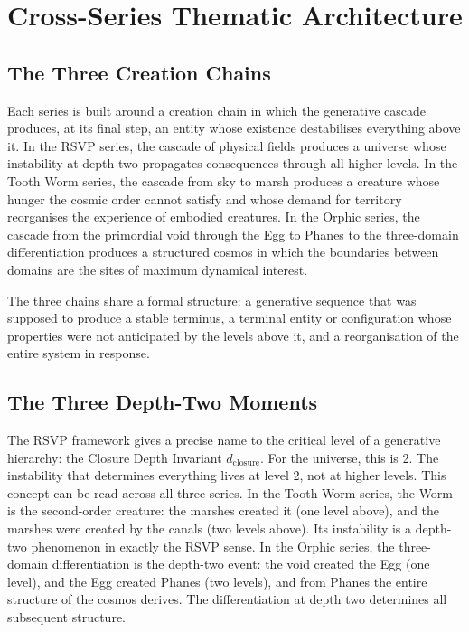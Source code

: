 \documentclass[12pt, a4paper]{article}
\begin{document}
\newpage
\section{Cross-Series Thematic Architecture}

\subsection{The Three Creation Chains}

Each series is built around a creation chain in which the generative cascade produces, at its final step, an entity whose existence destabilises everything above it. In the RSVP series, the cascade of physical fields produces a universe whose instability at depth two propagates consequences through all higher levels. In the Tooth Worm series, the cascade from sky to marsh produces a creature whose hunger the cosmic order cannot satisfy and whose demand for territory reorganises the experience of embodied creatures. In the Orphic series, the cascade from the primordial void through the Egg to Phanes to the three-domain differentiation produces a structured cosmos in which the boundaries between domains are the sites of maximum dynamical interest.

The three chains share a formal structure: a generative sequence that was supposed to produce a stable terminus, a terminal entity or configuration whose properties were not anticipated by the levels above it, and a reorganisation of the entire system in response.

\subsection{The Three Depth-Two Moments}

The RSVP framework gives a precise name to the critical level of a generative hierarchy: the Closure Depth Invariant $d_{\text{closure}}$. For the universe, this is 2. The instability that determines everything lives at level 2, not at higher levels. This concept can be read across all three series. In the Tooth Worm series, the Worm is the second-order creature: the marshes created it (one level above), and the marshes were created by the canals (two levels above). Its instability is a depth-two phenomenon in exactly the RSVP sense. In the Orphic series, the three-domain differentiation is the depth-two event: the void created the Egg (one level), and the Egg created Phanes (two levels), and from Phanes the entire structure of the cosmos derives. The differentiation at depth two determines all subsequent structure.
\end{document}
